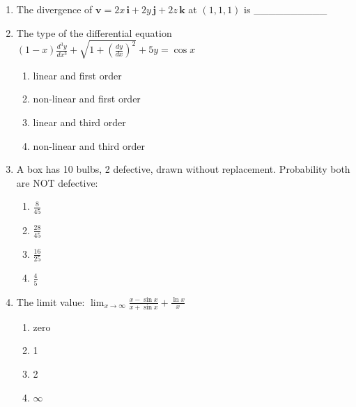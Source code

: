 \documentclass[journal,12pt,onecolumn]{IEEEtran}
\begin{document}
\begin{enumerate}[label=\arabic*)]
\vspace{0.5cm}

\item The divergence of $\mathbf{v} = 2x\,\mathbf{i} + 2y\,\mathbf{j} + 2z\,\mathbf{k}$ at $(1,1,1)$ is \_\_\_\_\_\_\_\_\_\_
\hfill{} \\
\vspace{0.5cm}

\item The type of the differential equation  
$(1-x)\frac{d^3 y}{dx^3} + \sqrt{1+\left(\frac{dy}{dx}\right)^2} + 5y = \cos{x}$
\hfill{} \\

\vspace{0.2cm}
\begin{enumerate}[label=\alph*)]
\item linear and first order
\item non-linear and first order
\item linear and third order
\item non-linear and third order
\end{enumerate}

\newpage

\item A box has 10 bulbs, 2 defective, drawn without replacement. Probability both are NOT defective:
\vspace{0.2cm}
\hfill{} \\

\begin{enumerate}[label=\alph*)]
\item $\frac{8}{45}$
\vspace{0.1cm}
\item $\frac{28}{45}$
\vspace{0.1cm}
\item $\frac{16}{25}$
\vspace{0.1cm}
\item $\frac{4}{5}$
\end{enumerate}

\vspace{0.5cm}

\item The limit value:
$\lim_{x\to\infty} \frac{x - \sin{x}}{x + \sin{x}} + \frac{\ln{x}}{x}$
\hfill{} \\

\vspace{0.2cm}
\begin{enumerate}[label=\alph*)]
\item zero
\item 1
\item 2
\item $\infty$
\end{enumerate}


\end{enumerate}
\end{document}
